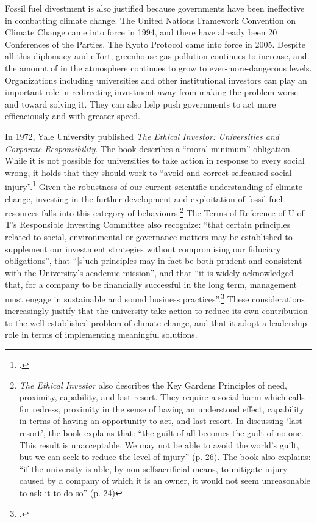 Fossil fuel divestment is also justified because governments have been ineffective in combatting climate change.
The United Nations Framework Convention on Climate Change came into force in 1994, and there have already been 20 Conferences of the Parties.
The Kyoto Protocol came into force in 2005.
Despite all this diplomacy and effort, greenhouse gas pollution continues to increase, and the amount of  in the atmosphere continues to grow to ever-more-dangerous levels.
Organizations including universities and other institutional investors can play an important role in redirecting investment away from making the problem worse and toward solving it.
They can also help push governments to act more efficaciously and with greater speed.



In 1972, Yale University published \emph{The Ethical Investor: Universities and Corporate Responsibility}.
The book describes a ``moral minimum'' obligation.
While it is not possible for universities to take action in response to every social wrong, it holds that they should work to ``avoid and correct self­caused social injury''.\footcite[][p. 21]{EthicalInvestor}
Given the robustness of our current scientific understanding of climate change, investing in the further development and exploitation of fossil fuel resources falls into this category of behaviours.\footnote{\emph{The Ethical Investor} also describes the Key Gardens Principles of need, proximity, capability, and last resort. They require a social harm which calls for redress, proximity in the sense of having an understood effect, capability in terms of having an opportunity to act, and last resort. In discussing `last resort', the book explains that: ``the guilt of all becomes the guilt of no one. This result is unacceptable. We may not be able to avoid the world's guilt, but we can seek to reduce the level of injury'' (p. 26). The book also explains: ``if the university is able, by non self­sacrificial means, to mitigate injury caused by a company of which it is an owner, it would not seem unreasonable to ask it to do so'' (p. 24)}
The Terms of Reference of U of T's Responsible Investing Committee also recognize: ``that certain principles related to social, environmental or governance matters may be established to supplement our investment strategies without compromising our fiduciary obligations'', that ``[s]uch principles may in fact be both prudent and consistent with the University's academic mission'', and that ``it is widely acknowledged that, for a company to be financially successful in the long term, management must engage in sustainable and sound business practices''.\footcite[][]{UTRICTOR}
These considerations increasingly justify that the university take action to reduce its own contribution to the well-established problem of climate change, and that it adopt a leadership role in terms of implementing meaningful solutions.



